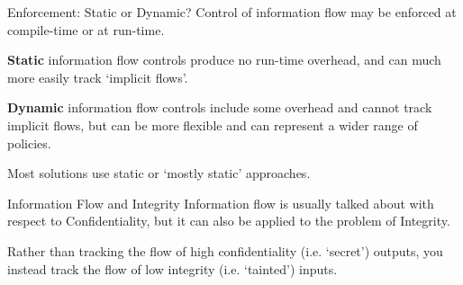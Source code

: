 \begin{frame}{Enforcement: Static or Dynamic?}
	Control of information flow may be enforced at compile-time or at run-time.
	
	\textbf{Static} information flow controls produce no run-time overhead, and can much more easily track `implicit flows'.
	
	\textbf{Dynamic} information flow controls include some overhead and cannot track implicit flows, but can be more flexible and can represent a wider range of policies.
	
	Most solutions use static or `mostly static' approaches.
\end{frame}

\begin{frame}{Information Flow and Integrity}
	Information flow is usually talked about with respect to Confidentiality, but it can also be applied to the problem of Integrity.
	
	Rather than tracking the flow of high confidentiality (i.e. `secret') outputs, you instead track the flow of low integrity (i.e. `tainted') inputs.
\end{frame}